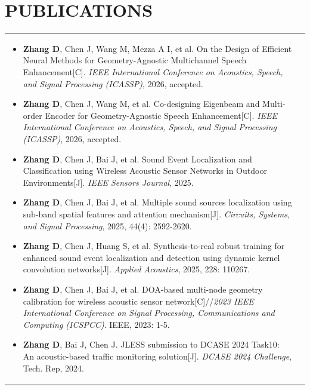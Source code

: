 \documentclass[a4paper,8pt]{article}
\begin{document}
\section{\textbf{PUBLICATIONS}}
\begin{tabularx}{\linewidth}{ @{}l r@{}}
\begin{minipage}[t]{\linewidth}
    \begin{itemize}[nosep,after=\strut, leftmargin=1em, itemsep=2pt]

        \item  \textbf{Zhang D}, Chen J, Wang M, Mezza A I, et al. On the Design of Efficient Neural Methods for Geometry-Agnostic Multichannel Speech Enhancement[C].  \textit{IEEE International Conference on Acoustics, Speech, and Signal Processing (ICASSP)}, 2026, accepted.
        
        \item \textbf{Zhang D}, Chen J, Wang M, et al. Co-designing Eigenbeam and Multi-order Encoder for Geometry-Agnostic Speech Enhancement[C]. \textit{IEEE International Conference on Acoustics, Speech, and Signal Processing (ICASSP)}, 2026, accepted.
        
        \item  \textbf{Zhang D}, Chen J, Bai J, et al. Sound Event Localization and Classification using Wireless Acoustic Sensor Networks in Outdoor Environments[J]. \textit{IEEE Sensors Journal}, 2025.
        
        \item \textbf{Zhang D}, Chen J, Bai J, et al. Multiple sound sources localization using sub-band spatial features and attention mechanism[J]. \textit{Circuits, Systems, and Signal Processing}, 2025, 44(4): 2592-2620.

        \item \textbf{Zhang D}, Chen J, Huang S, et al. Synthesis-to-real robust training for enhanced sound event localization and detection using dynamic kernel convolution networks[J]. \textit{Applied Acoustics}, 2025, 228: 110267.    
        
        \item \textbf{Zhang D}, Chen J, Bai J, et al. DOA-based multi-node geometry calibration for wireless acoustic sensor network[C]//\textit{2023 IEEE International Conference on Signal Processing, Communications and Computing (ICSPCC)}. IEEE, 2023: 1-5.     

        \item \textbf{Zhang D}, Bai J, Chen J. JLESS submission to DCASE 2024 Task10: An acoustic-based traffic monitoring solution[J]. \textit{DCASE 2024 Challenge}, Tech. Rep, 2024.


\end{itemize}
\end{minipage}
\end{tabularx}
\end{document}
